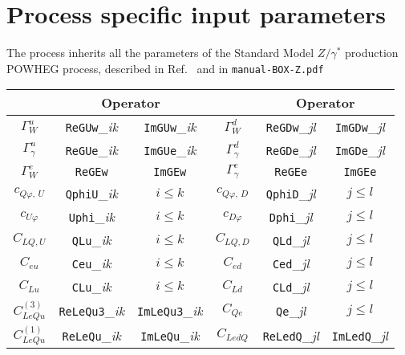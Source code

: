 \documentclass[paper]{JHEP3}
\begin{document}
\section{Process specific input parameters}

The process inherits all the parameters of the Standard Model $Z/\gamma^*$ production POWHEG process,
described in Ref.\ \cite{Alioli:2008gx} and in \texttt{manual-BOX-Z.pdf}


\begin{table}
\center
\begin{small}
\begin{tabular}{||c|cc||c|cc||}
\hline
								  &  \multicolumn{2}{|c||}{Operator} 	 					&
								  &  \multicolumn{2}{c||}{Operator} 												 \\
\hline
$\Gamma^u_W$ 		& \texttt{ReGUw}\_\textit{ik} & \texttt{ImGUw}\_\textit{ik}  				  		&
$\Gamma^d_W$ 		& \texttt{ReGDw}\_\textit{jl} & \texttt{ImGDw}\_\textit{jl} 				 		\\%
 $\Gamma^u_\gamma$   	& \texttt{ReGUe}\_\textit{ik} & \texttt{ImGUe}\_\textit{ik} 				  		& 
 $\Gamma^d_\gamma$   	& \texttt{ReGDe}\_\textit{jl}	& \texttt{ImGDe}\_\textit{jl}   		\\
$\Gamma^e_W$ 		& \texttt{ReGEw} & \texttt{ImGEw} 		         & 
$\Gamma^e_\gamma$ 	& \texttt{ReGEe} & \texttt{ImGEe} 					\\
\hline
$c^{}_{Q\varphi,\, U}$ 	& \texttt{QphiU}\_\textit{ik}				&   $i \le k$ 	& 
$c^{}_{Q\varphi,\, D}$ 	& \texttt{QphiD}\_\textit{jl} 				&   $j \le l$  	\\
$c_{U\varphi}$ 		& \texttt{Uphi}\_\textit{ik}	 			&   $i \le k$ 	& 
$c_{D\varphi}$ 		& \texttt{Dphi}\_\textit{jl}	    			&   $j \le l$  	\\
\hline
$C_{LQ,U}$ 		&  \texttt{QLu}\_\textit{ik} 				&   $i\le k$ 	&  
$C_{LQ,D}$ 		&  \texttt{QLd}\_\textit{jl}				&   $j\le l$ 	\\
$C_{eu}$   		& \texttt{Ceu}\_\textit{ik}  				&   $i\le k$  	&
$C_{ed}$   		& \texttt{Ced}\_\textit{jl}				&   $j\le l$  	\\
$C_{Lu}$   		& \texttt{CLu}\_\textit{ik}  				&   $i\le k$  	&  
$C_{Ld}$   		& \texttt{CLd}\_\textit{jl}				&   $j\le l$    \\
$C^{(3)}_{LeQu}$   	&  \texttt{ReLeQu3}\_\textit{ik}  	& \texttt{ImLeQu3}\_\textit{ik}		       	&  
$C_{Qe}$ 		& \texttt{Qe}\_\textit{jl} 				&   $j\le l$ 	\\
$C^{(1)}_{LeQu}$ 	& \texttt{ReLeQu}\_\textit{ik} 				&   \texttt{ImLeQu}\_\textit{ik}  & 
$C_{LedQ}$  		& \texttt{ReLedQ}\_\textit{jl} 				&  \texttt{ImLedQ}\_\textit{jl}	\\

\end{tabular}
\end{small}
\end{table}
\end{document}
